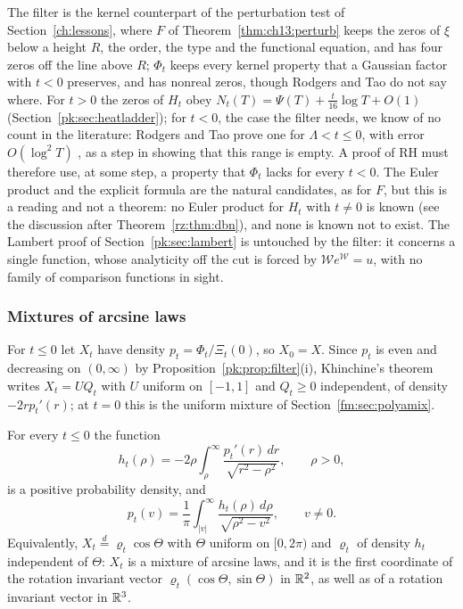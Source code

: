 The filter is the kernel counterpart of the perturbation test of Section~\ref{ch:lessons}, where $F$ of Theorem~\ref{thm:ch13:perturb} keeps the zeros of $\xi$ below a height $R$, the order, the type and the functional equation, and has four zeros off the line above $R$; $\Phi_t$ keeps every kernel property that a Gaussian factor with $t<0$ preserves, and has nonreal zeros, though Rodgers and Tao do not say where. For $t>0$ the zeros of $H_t$ obey $N_t(T)=\Psi(T)+\frac t{16}\log T+O(1)$ (Section~\ref{pk:sec:heatladder}); for $t<0$, the case the filter needs, we know of no count in the literature: Rodgers and Tao prove one for $\Lambda<t\le0$, with error $O(\log^2T)$ \cite[Section 3]{RodgersTao}, as a step in showing that this range is empty. A proof of RH must therefore use, at some step, a property that $\Phi_t$ lacks for every $t<0$. The Euler product and the explicit formula are the natural candidates, as for $F$, but this is a reading and not a theorem: no Euler product for $H_t$ with $t\ne0$ is known (see the discussion after Theorem~\ref{rz:thm:dbn}), and none is known not to exist. The Lambert proof of Section~\ref{pk:sec:lambert} is untouched by the filter: it concerns a single function, whose analyticity off the cut is forced by $\mathcal We^{\mathcal W}=u$, with no family of comparison functions in sight.

\subsubsection{Mixtures of arcsine laws}\label{pk:sec:arcsine}

For $t\le0$ let $X_t$ have density $p_t=\Phi_t/\Xi_t(0)$, so $X_0=X$. Since $p_t$ is even and decreasing on $(0,\infty)$ by Proposition~\ref{pk:prop:filter}(i), Khinchine's theorem writes $X_t=UQ_t$ with $U$ uniform on $[-1,1]$ and $Q_t\ge0$ independent, of density $-2rp_t'(r)$; at $t=0$ this is the uniform mixture of Section~\ref{fm:sec:polyamix}.

\begin{proposition}\label{pk:prop:arcsine}
For every $t\le0$ the function
\[
h_t(\rho)=-2\rho\int_\rho^\infty\frac{p_t'(r)\,dr}{\sqrt{r^2-\rho^2}},\qquad\rho>0,
\]
is a positive probability density, and
\[
p_t(v)=\frac1\pi\int_{|v|}^\infty\frac{h_t(\rho)\,d\rho}{\sqrt{\rho^2-v^2}},\qquad v\ne0.
\]
Equivalently, $X_t\overset d=\varrho_t\cos\Theta$ with $\Theta$ uniform on $[0,2\pi)$ and $\varrho_t$ of density $h_t$ independent of $\Theta$: $X_t$ is a mixture of arcsine laws, and it is the first coordinate of the rotation invariant vector $\varrho_t(\cos\Theta,\sin\Theta)$ in $\mathbb{R}^2$, as well as of a rotation invariant vector in $\mathbb{R}^3$.
\end{proposition}

